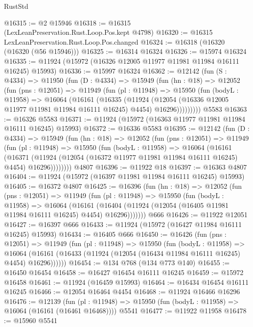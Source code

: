 \begin{lexlean}{RustStd}
\begin{coremodule}
{\begin{coremodule}
{{{{{{{{{{{{{{{{{{{{{{{{{{{{{{{{{{{{{{{{{{{{{{{{{{{{{{{{{{{{{{{{{{{{{{{{{{{{{{{{@16315 := @2 @15946
@16318 := @16315 (LexLeanPreservation.Rust.Loop.Pos.kept @4798)
@16320 := @16315 LexLeanPreservation.Rust.Loop.Pos.changed
@16324 := @16318 (@16320 (@16320 (@56 @15946)))
@16325 := @16314 @16324
@16326 := @15974 @16324
@16335 := @11924 (@15972 (@16326 @12005 @11977 @11981 @11984 @16111 @16245) @15993)
@16336 := @15997 @16324
@16362 := @12142
    (fun (S : @4334) =>
    @11950
      (fun (D : @4334) =>
      @15949
        (fun (hn : @18) =>
        @12052
          (fun (pns : @12051) =>
          @11949
            (fun (pl : @11948) =>
            @15950
              (fun (bodyL : @11958) =>
              @16064
                (@16161
                  (@16335
                    (@11924
                      (@12054 (@16336 @12005 @11977 @11981 @11984 @16111 @16245) @4454)
                      @16296)))))))))
    @5583
@16363 := @16326 @5583
@16371 := @11924 (@15972 (@16363 @11977 @11981 @11984 @16111 @16245) @15993)
@16372 := @16336 @5583
@16395 := @12142
    (fun (D : @4334) =>
    @15949
      (fun (hn : @18) =>
      @12052
        (fun (pns : @12051) =>
        @11949
          (fun (pl : @11948) =>
          @15950
            (fun (bodyL : @11958) =>
            @16064
              (@16161
                (@16371
                  (@11924 (@12054 (@16372 @11977 @11981 @11984 @16111 @16245) @4454) @16296))))))))
    @4807
@16396 := @11922 @18
@16397 := @16363 @4807
@16404 := @11924 (@15972 (@16397 @11981 @11984 @16111 @16245) @15993)
@16405 := @16372 @4807
@16425 := @16396
    (fun (hn : @18) =>
    @12052
      (fun (pns : @12051) =>
      @11949
        (fun (pl : @11948) =>
        @15950
          (fun (bodyL : @11958) =>
          @16064
            (@16161
              (@16404 (@11924 (@12054 (@16405 @11981 @11984 @16111 @16245) @4454) @16296)))))))
    @666
@16426 := @11922 @12051
@16427 := @16397 @666
@16433 := @11924 (@15972 (@16427 @11984 @16111 @16245) @15993)
@16434 := @16405 @666
@16450 := @16426
    (fun (pns : @12051) =>
    @11949
      (fun (pl : @11948) =>
      @15950
        (fun (bodyL : @11958) =>
        @16064 (@16161 (@16433 (@11924 (@12054 (@16434 @11984 @16111 @16245) @4454) @16296))))))
@16454 := @134 @768 (@134 @773 @140)
@16455 := @16450 @16454
@16458 := @16427 @16454 @16111 @16245
@16459 := @15972 @16458
@16461 := @11924 (@16459 @15993)
@16464 := @16434 @16454 @16111 @16245
@16466 := @12054 @16464 @4454
@16468 := @11924 @16466 @16296
@16476 := @12139
    (fun (pl : @11948) => @15950 (fun (bodyL : @11958) => @16064 (@16161 (@16461 @16468))))
    @5541
@16477 := @11922 @11958
@16478 := @15960 @5541
}}}}}}}}}}}}}}}}}}}}}}}}}}}}}}}}}}}}}}}}}}}}}}}}}}}}}}}}}}}}}}}}}}}}}}}}}}}}}}}}
\end{coremodule}}
\end{coremodule}
\end{lexlean}
